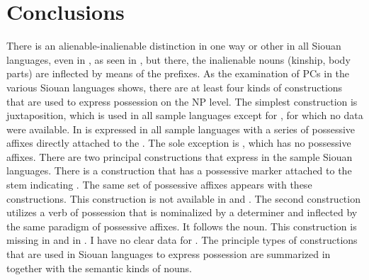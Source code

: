 \documentclass[output=paper]{LSP/langsci}
\begin{document}
\section{Conclusions}
There is an alienable-inalienable distinction in one way or other in all Siouan languages, even in , as seen in , but there, the inalienable nouns (kinship, body parts) are inflected by means of the  prefixes. As the examination of PCs in the various Siouan languages shows, there are at least four kinds of constructions that are used to express possession on the NP level. The simplest construction is  juxtaposition, which is used in all sample languages except for , for which no data were available. In is expressed in all sample languages with a series of possessive affixes directly attached to the . The sole exception is , which has no possessive affixes. There are two principal constructions that express  in the sample Siouan languages. There is a construction that has a possessive marker attached to the stem indicating . The same set of possessive affixes appears with these constructions. This construction is not available in  and . The second construction utilizes a verb of possession that is nominalized by a determiner and inflected by the same paradigm of possessive affixes. It follows the  noun. This construction is missing in  and in . I have no clear data for . The principle types of constructions that are used in Siouan languages to express possession are summarized in  together with the semantic kinds of  nouns. 
\end{document}
